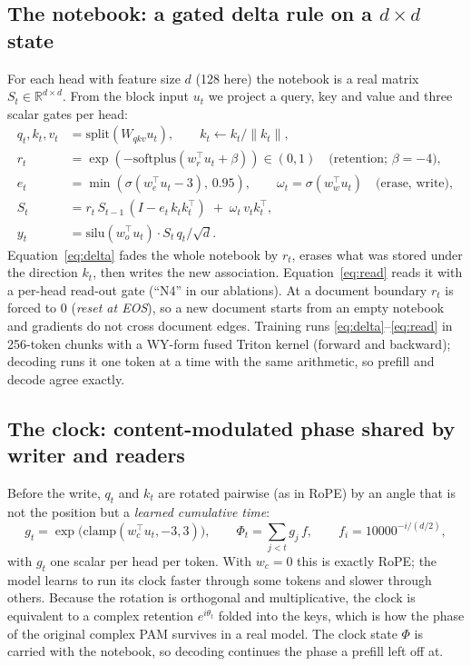 \documentclass[11pt]{article}
\begin{document}
\subsection{The notebook: a gated delta rule on a $d\times d$ state}
\label{sec:notebook}
For each head with feature size $d$ (128 here) the notebook is a real matrix $S_t\in\mathbb{R}^{d\times d}$. From the block input $u_t$ we project a query, key and value and three scalar gates per head:
\begin{align}
q_t,k_t,v_t &= \mathrm{split}(W_{qkv}u_t),\qquad k_t \leftarrow k_t/\|k_t\|,\\
r_t &= \exp(-\mathrm{softplus}(w_r^\top u_t + \beta)) \in (0,1) \quad\text{(retention; } \beta=-4),\\
e_t &= \min(\sigma(w_e^\top u_t - 3),\,0.95), \qquad \omega_t = \sigma(w_w^\top u_t) \quad\text{(erase, write)},\\
S_t &= r_t\, S_{t-1}\,(I - e_t\,k_t k_t^\top) \;+\; \omega_t\, v_t k_t^\top, \label{eq:delta}\\
y_t &= \mathrm{silu}(w_o^\top u_t)\cdot S_t\,q_t / \sqrt{d}. \label{eq:read}
\end{align}
Equation~\eqref{eq:delta} fades the whole notebook by $r_t$, erases what was stored under the direction $k_t$, then writes the new association. Equation~\eqref{eq:read} reads it with a per-head read-out gate (``N4'' in our ablations). At a document boundary $r_t$ is forced to 0 (\emph{reset at EOS}), so a new document starts from an empty notebook and gradients do not cross document edges. Training runs \eqref{eq:delta}--\eqref{eq:read} in 256-token chunks with a WY-form fused Triton kernel (forward and backward); decoding runs it one token at a time with the same arithmetic, so prefill and decode agree exactly.

\subsection{The clock: content-modulated phase shared by writer and readers}
\label{sec:clock}
Before the write, $q_t$ and $k_t$ are rotated pairwise (as in RoPE) by an angle that is not the position but a \emph{learned cumulative time}:
\begin{equation}
g_t = \exp\!\big(\mathrm{clamp}(w_c^\top u_t,-3,3)\big),\qquad \Phi_t = \sum_{j<t} g_j\, f,\qquad f_i = 10000^{-i/(d/2)},
\end{equation}
with $g_t$ one scalar per head per token. With $w_c=0$ this is exactly RoPE; the model learns to run its clock faster through some tokens and slower through others. Because the rotation is orthogonal and multiplicative, the clock is equivalent to a complex retention $e^{i\theta_t}$ folded into the keys, which is how the phase of the original complex PAM survives in a real model. The clock state $\Phi$ is carried with the notebook, so decoding continues the phase a prefill left off at.
\end{document}
